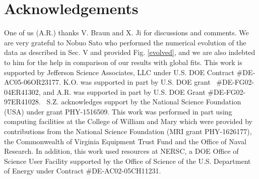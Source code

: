 \section*{Acknowledgements}

One of us (A.R.) thanks V. Braun and X. Ji for discussions and comments. 
We are very grateful to Nobuo Sato  who performed the numerical evolution of the data as described in Sec. V 
 and provided Fig. \ref{evolved}, 
and we are also indebted to him for the help in comparison of our results with global fits. 
This work is supported by Jefferson Science Associates,
 LLC under  U.S. DOE Contract \#DE-AC05-06OR23177. 
 K.O. was supported in part by U.S.  DOE grant
\mbox{ \#DE-FG02-04ER41302}, and A.R. was   supported in part 
 by U.S. DOE Grant   \mbox{\#DE-FG02-97ER41028. }
 S.Z. acknowledges support
by the National Science Foundation (USA) under grant
PHY-1516509. 
 This work was performed in part using computing facilities at the
  College of William and Mary which were provided by contributions from the 
  National Science Foundation (MRI grant PHY-1626177), the Commonwealth of 
  Virginia Equipment Trust Fund and the Office of Naval Research. In addition,  
  this work used resources at NERSC, a DOE Office of Science User Facility supported by the Office of Science of the U.S. Department of Energy under Contract \#DE-AC02-05CH11231.


